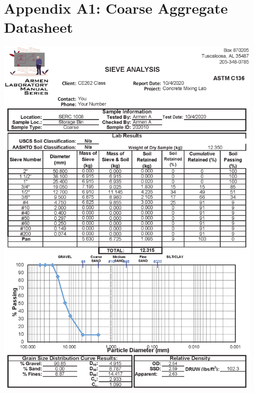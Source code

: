 \documentclass[12pt]{article}
\begin{document}
\pagebreak

\section*{Appendix A1: Coarse Aggregate Datasheet}
\label{AppendixB}
\begin{center}
    \includegraphics[width=1\linewidth]{Coarse.eps}
\end{center}

\pagebreak
\end{document}
